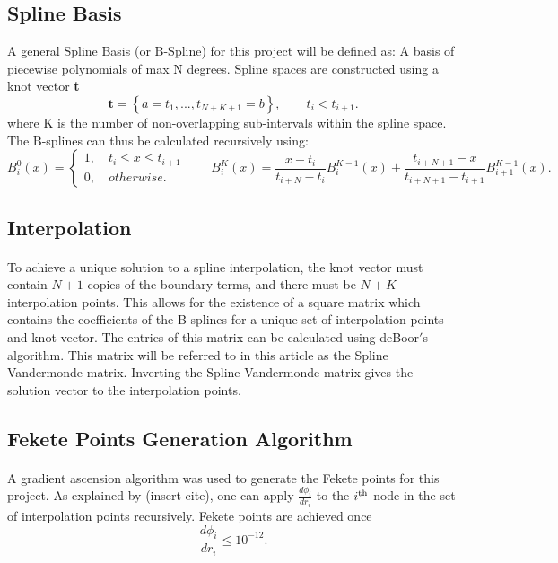\documentclass{article}
\begin{document}
\subsection*{Spline Basis}
A general Spline Basis (or B-Spline) for this project will be defined as: A basis of piecewise polynomials of max N degrees. Spline spaces are constructed using a knot vector \textbf{t}
\begin{equation*}
\textbf{t}=\left\{a=t_1,...,t_{N+K+1}=b\right\},\qquad t_i<t_{i+1}.
\end{equation*}
where K is the number of non-overlapping sub-intervals within the spline space. The B-splines can thus be calculated recursively using:
\begin{equation*}
B^0_i(x)=\begin{cases}
1,\quad t_i\leq x\leq t_{i+1}\\
0,\quad otherwise.
\end{cases}
\qquad
B^K_i(x)=\frac{x-t_i}{t_{i+N}-t_i}B^{K-1}_i(x)+\frac{t_{i+N+1}-x}{t_{i+N+1}-t_{i+1}}B^{K-1}_{i+1}(x).
\end{equation*}

\subsection*{Interpolation}
\paragraph{}
To achieve a unique solution to a spline interpolation, the knot vector must contain $N+1$ copies of the boundary terms, and there must be $N+K$ interpolation points. This allows for the existence of a square matrix which contains the coefficients of the B-splines for a unique set of interpolation points and knot vector. The entries of this matrix can be calculated using deBoor$'$s algorithm. This matrix will be referred to in this article as the Spline Vandermonde matrix. Inverting the Spline Vandermonde matrix gives the solution vector to the interpolation points.

\subsection*{Fekete Points Generation Algorithm}
\paragraph{}
A gradient ascension algorithm was used to generate the Fekete points for this project. As explained by (insert cite), one can apply $\frac{d\phi_i}{dr_i}$ to the $i\textsuperscript{th}$ node in the set of interpolation points recursively. Fekete points are achieved once 
\begin{equation*}\frac{d\phi_i}{dr_i}\leq 10^{-12}.\end{equation*}
\end{document}
